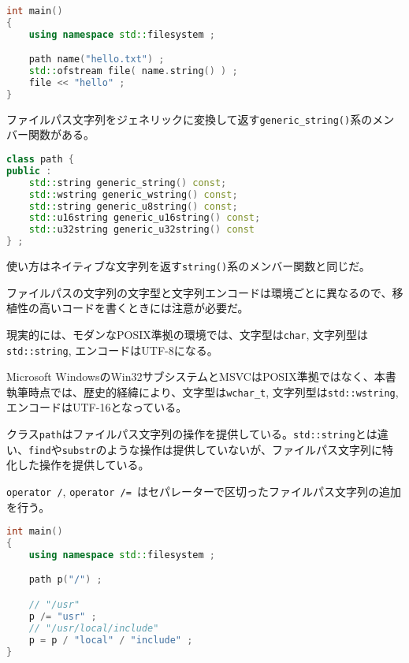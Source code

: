 \begin{lstlisting}[language=C++]
int main()
{
    using namespace std::filesystem ;

    path name("hello.txt") ;
    std::ofstream file( name.string() ) ;
    file << "hello" ;
}
\end{lstlisting}

ファイルパス文字列をジェネリックに変換して返す\lstinline!generic_string()!系のメンバー関数がある。

\begin{lstlisting}[language=C++]
class path {
public :
    std::string generic_string() const;
    std::wstring generic_wstring() const;
    std::string generic_u8string() const;
    std::u16string generic_u16string() const;
    std::u32string generic_u32string() const
} ;
\end{lstlisting}

使い方はネイティブな文字列を返す\lstinline!string()!系のメンバー関数と同じだ。

ファイルパスの文字列の文字型と文字列エンコードは環境ごとに異なるので、移植性の高いコードを書くときには注意が必要だ。

現実的には、モダンなPOSIX準拠の環境では、文字型は\lstinline!char!,
文字列型は\lstinline!std::string!, エンコードはUTF-8になる。

Microsoft
WindowsのWin32サブシステムとMSVCはPOSIX準拠ではなく、本書執筆時点では、歴史的経緯により、文字型は\lstinline!wchar_t!,
文字列型は\lstinline!std::wstring!, エンコードはUTF-16となっている。

%

クラス\lstinline!path!はファイルパス文字列の操作を提供している。\lstinline!std::string!とは違い、\lstinline!find!や\lstinline!substr!のような操作は提供していないが、ファイルパス文字列に特化した操作を提供している。

\lstinline!operator /!,
\lstinline!operator /=!~はセパレーターで区切ったファイルパス文字列の追加を行う。

\begin{lstlisting}[language=C++]
int main()
{
    using namespace std::filesystem ;

    path p("/") ;

    // "/usr"
    p /= "usr" ;
    // "/usr/local/include"
    p = p / "local" / "include" ;
}
\end{lstlisting}

